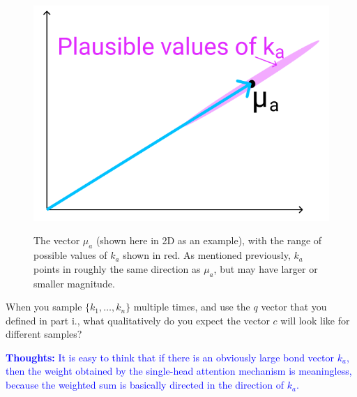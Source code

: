 \documentclass[letterpaper,12pt]{article}
\begin{document}
\begin{itemize}
		\begin{figure}[htbp] 
			\centering 
			\includegraphics[width=0.5\linewidth]{ka_plausible}
			\captionsetup{font=small}
			\label{vector}
			\caption{
				\label{fig: vector} %
				The vector $\mu_a$ (shown here in 2D as an example), with the range of possible values of $k_a$ shown in red. As mentioned previously, $k_a$ points in roughly the same direction as $\mu_a$, but may have larger or smaller magnitude.
			}
		\end{figure}
		
		When you sample $\{k_1, \ldots , k_n\}$ multiple times, and use the $q$ vector that you defined in part i., what qualitatively do you expect the vector $c$ will look like for different samples?
		
		\textcolor{blue}{\textbf{Thoughts:} It is easy to think that if there is an obviously large bond vector $k_a$, then the weight obtained by the single-head attention mechanism is meaningless, because the weighted sum is basically directed in the direction of $k_a$.}
		

\end{itemize}
\end{document}
